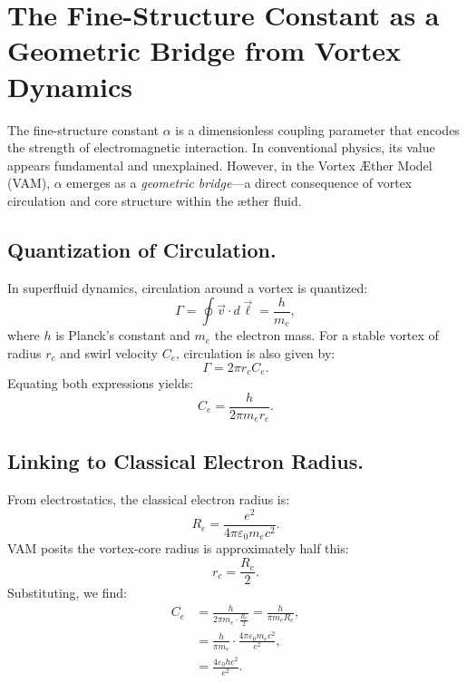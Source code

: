 \section{The Fine-Structure Constant as a Geometric Bridge from Vortex Dynamics}
\label{sec:alpha-geometric-bridge}

The fine-structure constant \( \alpha \) is a dimensionless coupling parameter that encodes the strength of electromagnetic interaction. In conventional physics, its value appears fundamental and unexplained. However, in the Vortex Æther Model (VAM), \( \alpha \) emerges as a \emph{geometric bridge}—a direct consequence of vortex circulation and core structure within the æther fluid.

\subsection{Quantization of Circulation.}
In superfluid dynamics, circulation around a vortex is quantized:
\begin{equation*}
    \Gamma = \oint \vec{v} \cdot d\vec{\ell} = \frac{h}{m_e},
\end{equation*}
where \( h \) is Planck's constant and \( m_e \) the electron mass. For a stable vortex of radius \( r_c \) and swirl velocity \( C_e \), circulation is also given by:
\begin{equation*}
    \Gamma = 2 \pi r_c C_e.
\end{equation*}
Equating both expressions yields:
\begin{equation}
    C_e = \frac{h}{2\pi m_e r_c}.
\end{equation}

\subsection{Linking to Classical Electron Radius.}
From electrostatics, the classical electron radius is:
\begin{equation*}
    R_e = \frac{e^2}{4\pi \varepsilon_0 m_e c^2}.
\end{equation*}
VAM posits the vortex-core radius is approximately half this:
\begin{equation*}
    r_c = \frac{R_e}{2}.
\end{equation*}
Substituting, we find:
\begin{align}
    C_e &= \frac{h}{2\pi m_e \cdot \frac{R_e}{2}} = \frac{h}{\pi m_e R_e}, \\
    &= \frac{h}{\pi m_e} \cdot \frac{4\pi \varepsilon_0 m_e c^2}{e^2}, \\
    &= \frac{4 \varepsilon_0 h c^2}{e^2}.
\end{align}

